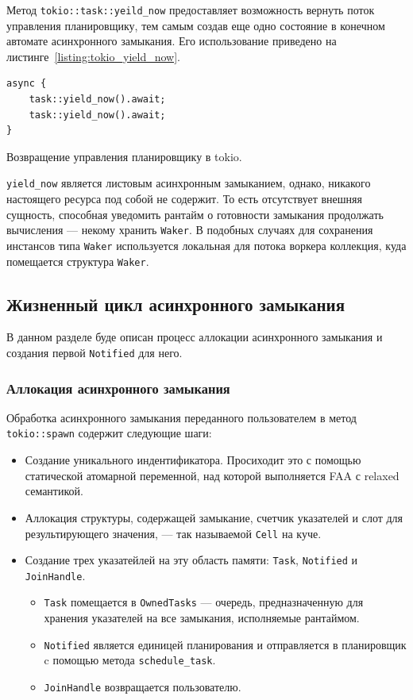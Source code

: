 Метод \verb|tokio::task::yeild_now| предоставляет возможность вернуть поток управления планировщику, тем самым создав еще одно состояние в конечном автомате асинхронного замыкания. Его использование приведено на листинге~\ref{listing:tokio_yield_now}.

\begin{listing}[H]
    \begin{verbatim}
async {
    task::yield_now().await;
    task::yield_now().await;
}
    \end{verbatim}

    \caption{Возвращение управления планировщику в tokio.}
    \label{listing:tokio_yield_now}
\end{listing}

\verb|yield_now| является листовым асинхронным замыканием, однако, никакого настоящего ресурса под собой не содержит. То есть отсутствует внешняя сущность, способная уведомить рантайм о готовности замыкания продолжать вычисления --- некому хранить \verb|Waker|. В подобных случаях для сохранения инстансов типа \verb|Waker| используется локальная для потока воркера коллекция, куда помещается структура \verb|Waker|.

\subsection{Жизненный цикл асинхронного замыкания}

В данном разделе буде описан процесс аллокации асинхронного замыкания и создания первой \verb|Notified| для него.

\subsubsection{Аллокация асинхронного замыкания}

Обработка асинхронного замыкания переданного пользователем в метод \verb|tokio::spawn| содержит следующие шаги:

\begin{itemize}
    \item Создание уникального индентификатора. Просиходит это с помощью статической атомарной переменной, над которой выполняется FAA с relaxed семантикой.
    \item Аллокация структуры, содержащей замыкание, счетчик указателей и слот для результирующего значения, --- так называемой \verb|Cell| на куче.
    \item Создание трех указатейлей на эту область памяти: \verb|Task|, \verb|Notified| и \verb|JoinHandle|.
    \begin{itemize}
        \item \verb|Task| помещается в \verb|OwnedTasks| --- очередь, предназначенную для хранения указателей на все замыкания, исполняемые рантаймом.
        \item \verb|Notified| является единицей планирования и отправляется в планировщик c помощью метода \verb|schedule_task|.
        \item \verb|JoinHandle| возвращается пользователю.
    \end{itemize}
\end{itemize}

